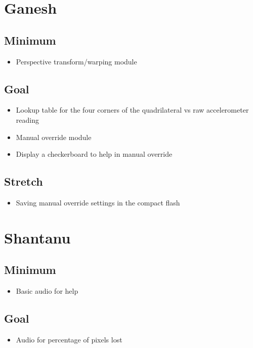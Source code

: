 \documentclass{article}
\begin{document}
\maketitle
\section{Ganesh}
\subsection{Minimum}
\begin{itemize}
\item Perspective transform/warping module
\end{itemize}
\subsection{Goal}
\begin{itemize}
\item Lookup table for the four corners of the quadrilateral vs raw accelerometer reading
\item Manual override module
\item Display a checkerboard to help in manual override
\end{itemize}
\subsection{Stretch}
\begin{itemize}
\item Saving manual override settings in the compact flash
\end{itemize}

\section{Shantanu}
\subsection{Minimum}
\begin{itemize}
    \item Basic audio for help
\end{itemize}
\subsection{Goal}
\begin{itemize}
    \item Audio for percentage of pixels lost
\end{itemize}
\end{document}

